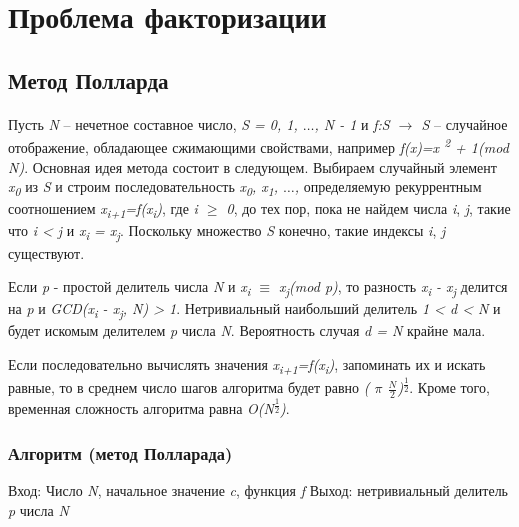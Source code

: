 \section{Проблема факторизации}

\subsection{Метод Полларда}

\paragraph{} Пусть \textit{N} – нечетное составное число, \textit{S = {0, 1, {$\dots$}, N - 1}} и \textit{f:S {$\rightarrow$} S} – случайное отображение, 
обладающее сжимающими свойствами, например \textit{f(x)=x\textsuperscript{ 2} + 1(mod N)}. Основная идея метода состоит в следующем. Выбираем случайный 
элемент \textit{x\textsubscript{0}} из \textit{S} и строим последовательность \textit{x\textsubscript{0}, x\textsubscript{1}, {$\dots$}, } 
определяемую рекуррентным соотношением \textit{x\textsubscript{i+1}=f(x\textsubscript{i})}, где \textit{i {$\ge$} 0}, до тех пор, пока не 
найдем числа \textit{i}, \textit{j}, такие что \textit{i < j} и \textit{x\textsubscript{i} = x\textsubscript{j}}. Поскольку множество \textit{S} 
конечно, такие индексы \textit{i}, \textit{j} существуют.

  Если \textit{p} - простой делитель числа \textit{N} и \textit{x\textsubscript{i} {$\equiv$} x\textsubscript{j}(mod p)}, то разность
\textit{x\textsubscript{i} - x\textsubscript{j}} делится на \textit{p} и \textit{GCD(x\textsubscript{i} - x\textsubscript{j}, N) > 1}. Нетривиальный 
наибольший делитель \textit{1 < d < N} и будет искомым делителем \textit{p} числа \textit{N}. Вероятность случая \textit{d = N} крайне мала.

  Если последовательно вычислять значения \textit{x\textsubscript{i+1}=f(x\textsubscript{i})}, запоминать их и искать равные, то в среднем число шагов 
алгоритма будет равно \textit{( {$\pi$} {$\frac{N}{2}$})\textsuperscript{ {$\frac{1}{2}$}}}. Кроме того, временная сложность алгоритма равна
\textit{O(N\textsuperscript{ {$\frac{1}{2}$}})}.

  \subsubsection{Алгоритм (метод Полларада)}
  
  Вход: Число \textit{N}, начальное значение \textit{c}, функция \textit{f}  
  Выход: нетривиальный делитель \textit{p} числа \textit{N}
  
